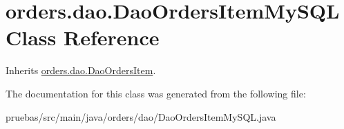 \hypertarget{classorders_1_1dao_1_1_dao_orders_item_my_s_q_l}{}\section{orders.\+dao.\+Dao\+Orders\+Item\+My\+S\+QL Class Reference}
\label{classorders_1_1dao_1_1_dao_orders_item_my_s_q_l}


Inherits \mbox{\hyperlink{interfaceorders_1_1dao_1_1_dao_orders_item}{orders.\+dao.\+Dao\+Orders\+Item}}.



The documentation for this class was generated from the following file\+:\begin{DoxyCompactItemize}
\item 
pruebas/src/main/java/orders/dao/Dao\+Orders\+Item\+My\+S\+Q\+L.\+java\end{DoxyCompactItemize}
